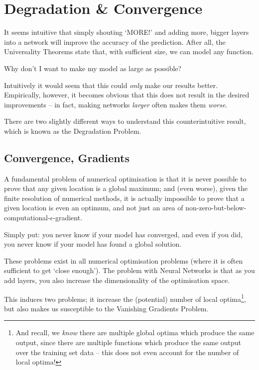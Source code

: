 \documentclass[a4paper,openany,11pt]{book}
\begin{document}
			\section{Degradation \& Convergence}

				It seems intuitive that simply shouting `MORE!' and adding more, bigger layers into a network will improve the accuracy of the prediction. After all, the Universality Theorems state that, with sufficient size, we can model any function. 

				Why don't I want to make my model as large as possible?

				Intuitively it would seem that this could \textit{only} make our results better. Empirically, however, it becomes obvious that this does not result in the desired improvements -- in fact, making networks \textit{larger} often makes them \textit{worse}.
				
				There are two slightly different ways to understand this counterintuitive result, which is known as the Degradation Problem.

				\subsection{Convergence, Gradients}

					A fundamental problem of numerical optimisation is that it is never possible to prove that any given location is a global maximum; and (even worse), given the finite resolution of numerical methods, it is actually impossible to prove that a given location is even an optimum, and not just an area of non-zero-but-below-computational-$\epsilon$-gradient.

					Simply put: you never know if your model has converged, and even if you did, you never know if your model has found a global solution. 

					These problems exist in all numerical optimisation problems (where it is often sufficient to get `close enough'). The problem with Neural Networks is that as you add layers, you also increase the dimensionality of the optimisation space. 

					This induces two problems; it increase the (potential) number of local optima\footnote{And recall, we \textit{know} there are multiple global optima which produce the same output, since there are multiple functions which produce the same output over the training set data -- this does not even account for the number of local optima!}, but also makes us susceptible to the Vanishing Gradients Problem. 
\end{document}
